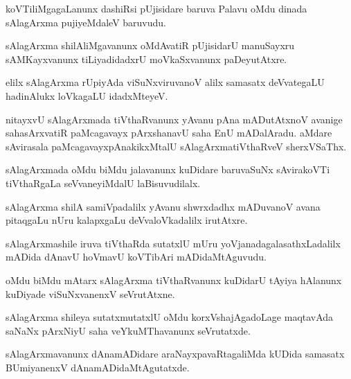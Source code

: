 \documentclass{article}
\begin{document}
\begin{mn}
koVTiliMgagaLanunx dashiRsi pUjisidare baruva Palavu oMdu dinada sAlagArxma pujiyeMdaleV baruvudu.
\end{mn}

\begin{mn}
sAlagArxma shilAliMgavanunx oMdAvatiR pUjisidarU manuSayxru sAMKayxvanunx tiLiyadidadxrU 
moVkaSxvanunx paDeyutAtxre.
\end{mn}

\begin{mn}
elilx sAlagArxma rUpiyAda viSuNxviruvanoV alilx samasatx deVvategaLU hadinAlukx loVkagaLU 
idadxMteyeV. 
\end{mn}

\begin{mn}
nitayxvU sAlagArxmada tiVthaRvanunx yAvanu pAna mADutAtxnoV avanige sahasArxvatiR paMcagavayx 
pArxshanavU saha EnU mADalAradu. aMdare sAvirasala paMcagavayxpAnakikxMtalU sAlagArxmatiVthaRveV 
sherxVSaThx.
\end{mn}

\begin{mn}
sAlagArxmada oMdu biMdu jalavanunx kuDidare baruvaSuNx sAvirakoVTi tiVthaRgaLa seVvaneyiMdalU 
laBisuvudilalx.
\end{mn}

\begin{mn}
sAlagArxma shilA samiVpadalilx yAvanu shwrxdadhx mADuvanoV avana pitaqgaLu nUru kalapxgaLu 
deVvaloVkadalilx irutAtxre.
\end{mn}

\begin{mn}
sAlagArxmashile iruva tiVthaRda sutatxlU mUru yoVjanadagalasathxLadalilx mADida dAnavU hoVmavU 
koVTibAri mADidaMtAguvudu.
\end{mn}

\begin{mn}
oMdu biMdu mAtarx sAlagArxma tiVthaRvanunx kuDidarU tAyiya hAlanunx kuDiyade viSuNxvanenxV 
seVrutAtxne. 
\end{mn}

\begin{mn}
sAlagArxma shileya sutatxmutatxlU oMdu korxVshajAgadoLage maqtavAda saNaNx pArxNiyU saha 
veYkuMThavanunx seVrutatxde.
\end{mn}

\begin{mn}
sAlagArxmavanunx dAnamADidare araNayxpavaRtagaliMda kUDida samasatx BUmiyanenxV 
dAnamADidaMtAgutatxde.
\end{mn}
\end{document}
